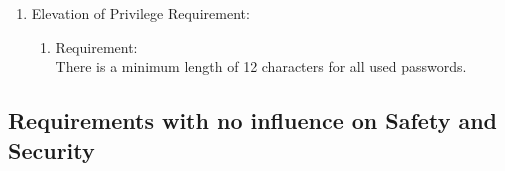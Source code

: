 \begin{enumerate}[label*=\arabic*.]
           
        \item \label{sreq.2} Elevation of Privilege Requirement:  \\
        \begin{enumerate}[label*=\arabic*.]
			\item \label{req.6.6.1}  Requirement:  \\
            There is a minimum length of 12 characters for all used passwords.\\
	  \end{enumerate}
   
        
    \end{enumerate}         



\subsection{Requirements with no influence on Safety and Security}
